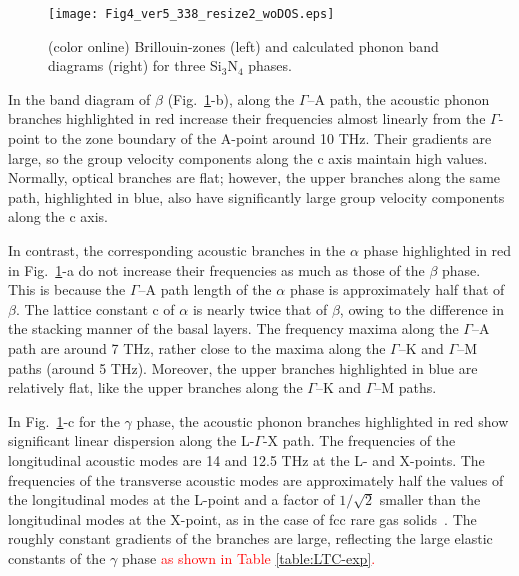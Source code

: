 \documentclass[twocolumn,amsmath,amssymb,a4paper,prb,superscriptaddress,floatfix]{revtex4-1}
\begin{document}
\begin{figure}[ht]
 \begin{center}
  \texttt{[image: Fig4\_ver5\_338\_resize2\_woDOS.eps]}
  \caption{(color online) Brillouin-zones (left) and calculated phonon band diagrams (right) for three Si$_3$N$_4$ phases.
  \label{fig:Fig4_ver5_338} }
 \end{center}
\end{figure}

In the band diagram of $\beta$ (Fig.~\ref{fig:Fig4_ver5_338}-b), along
the $\Gamma$--A path, the acoustic phonon branches highlighted in red
increase their frequencies almost linearly from the $\Gamma$-point to
the zone boundary of the A-point around 10 THz. Their gradients are
large, so the group velocity components along the c axis maintain high
values. Normally, optical branches are flat; however, the upper branches
along the same path, highlighted in blue, also have significantly large
group velocity components along the c axis.

In contrast, the corresponding acoustic branches in the $\alpha$ phase
highlighted in red in Fig.~\ref{fig:Fig4_ver5_338}-a do not increase
their frequencies as much as those of the $\beta$ phase. This is because
the $\Gamma$--A path length of the $\alpha$ phase is approximately half
that of $\beta$. The lattice constant c of $\alpha$ is nearly twice that
of $\beta$, owing to the difference in the stacking manner of the basal
layers. The frequency maxima along the $\Gamma$--A path are around 7 THz,
rather close to the maxima along the $\Gamma$--K and $\Gamma$--M paths
(around 5 THz). Moreover, the upper branches highlighted in blue are
relatively flat, like the upper branches along the $\Gamma$--K and
$\Gamma$--M paths.


In Fig.~\ref{fig:Fig4_ver5_338}-c for the $\gamma$ phase, the acoustic phonon branches
highlighted in red show significant linear dispersion along the
L-$\Gamma$-X path. The frequencies of the longitudinal acoustic modes
are 14 and 12.5 THz at the L- and X-points. The frequencies of the
transverse acoustic modes are approximately half the values of the
longitudinal modes at the L-point and a factor of $1/\sqrt{2}$ smaller
than the longitudinal modes at the X-point, as in the case of fcc rare
gas solids~\cite{dove-p30}. The roughly constant gradients of the branches are large,
reflecting the large elastic constants of the $\gamma$ phase
\textcolor{red}{as shown in Table \ref{table:LTC-exp}.} 
%
\end{document}
